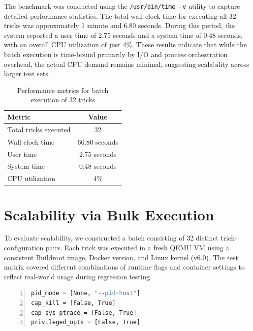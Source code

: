 \begin{doublespace}
The benchmark was conducted using the \texttt{/usr/bin/time -v} utility to capture detailed performance statistics. The total wall-clock time for executing all 32 tricks was approximately 1 minute and 6.80 seconds. During this period, the system reported a user time of 2.75 seconds and a system time of 0.48 seconds, with an overall CPU utilization of just 4\%. These results indicate that while the batch execution is time-bound primarily by I/O and process orchestration overhead, the actual CPU demand remains minimal, suggesting scalability across larger test sets.

\begin{table}[ht]
\centering
\caption{Performance metrics for batch execution of 32 tricks}
\label{tab:batch-execution}
\begin{tabular}{|l|c|}
\hline
\textbf{Metric}         & \textbf{Value} \\
\hline
Total tricks executed   & 32 \\
Wall-clock time         & 66.80 seconds \\
User time               & 2.75 seconds \\
System time             & 0.48 seconds \\
CPU utilization         & 4\% \\
\hline
\end{tabular}
\end{table}



















\section{Scalability via Bulk Execution}

To evaluate scalability, we constructed a batch consisting of 32 distinct trick-configuration pairs. Each trick was executed in a fresh QEMU VM using a consistent Buildroot image, Docker version, and Linux kernel (v6.0). The test matrix covered different combinations of runtime flags and container settings to reflect real-world usage during regression testing.

\begin{lstlisting}[language=bash, caption={Trick Configuration Parameters}, label={lst:escape-trick}, numbers=left, numberstyle=\tiny, stepnumber=1, frame=single, breaklines=true, backgroundcolor=\color{gray!10}, basicstyle=\ttfamily\footnotesize, showspaces=false, showstringspaces=false]
pid_mode = [None, "--pid=host"]
cap_kill = [False, True]
cap_sys_ptrace = [False, True]
privileged_opts = [False, True]
\end{lstlisting}


\end{doublespace}
